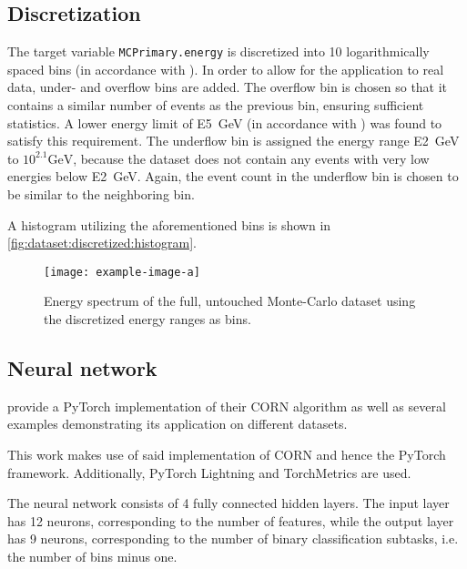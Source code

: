 \subsection{Discretization}
The target variable \texttt{MCPrimary.energy} is discretized into \num{10} logarithmically spaced bins
(in accordance with \cite{dsea_samuel}).
%
In order to allow for the application to real data,
under- and overflow bins are added.
%
The overflow bin is chosen so that it contains a similar number of events as the previous bin,
ensuring sufficient statistics.
A lower energy limit of \SI{E5}{\giga\electronvolt} (in accordance with \cite{dsea_samuel}) was found to satisfy this requirement.
%
The underflow bin is assigned the energy range \SI{E2}{\giga\electronvolt} to $10^{2.1} \si{\giga\electronvolt}$,
because the dataset does not contain any events with very low energies below \SI{E2}{\giga\electronvolt}.
Again, the event count in the underflow bin is chosen to be similar to the neighboring bin.

A histogram utilizing the aforementioned bins is shown in \autoref{fig:dataset:discretized:histogram}.

\begin{figure}
  \centering
  \texttt{[image: example-image-a]}
  \caption{Energy spectrum of the full, untouched Monte-Carlo dataset using the discretized energy ranges as bins.}
  \label{fig:dataset:discretized:histogram}
\end{figure}


\subsection{Neural network}
\citeauthor{corn} provide a PyTorch \cite{pytorch} implementation of their CORN algorithm
as well as several examples demonstrating its application on different datasets.

This work makes use of said implementation of CORN
and hence the PyTorch framework.
Additionally, PyTorch Lightning \cite{pytorch_lightning} and TorchMetrics \cite{torch_metrics} are used.

The neural network consists of \num{4} fully connected hidden layers.
The input layer has \num{12} neurons,
  corresponding to the number of features,
while the output layer has \num{9} neurons,
  corresponding to the number of binary classification subtasks,
    i.e. the number of bins minus one.

